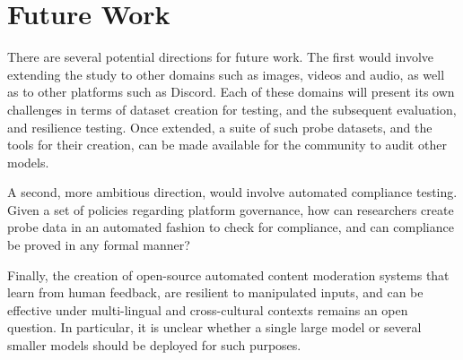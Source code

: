 \documentclass{article}
\begin{document}
\section*{Future Work}
There are several potential directions for future work. The first would involve
extending the study to other domains such as images, videos and audio, as well
as to other platforms such as Discord. Each of these domains will present its
own challenges in terms of dataset creation for testing, and the subsequent
evaluation, and resilience testing. Once extended, a suite of such probe
datasets, and the tools for their creation, can be made available for the community to audit other models.

A second, more ambitious direction, would
involve automated compliance testing. Given a set of policies regarding platform
governance, how can researchers create probe data in an automated fashion to
check for compliance, and can compliance be proved in any formal manner?

Finally, the creation of open-source automated content moderation systems that
learn from human feedback, are resilient to manipulated inputs, and can be
effective under multi-lingual and cross-cultural contexts remains an open
question. In particular, it is unclear whether a single large model or several
smaller models should be deployed for such purposes. 



\end{document}
